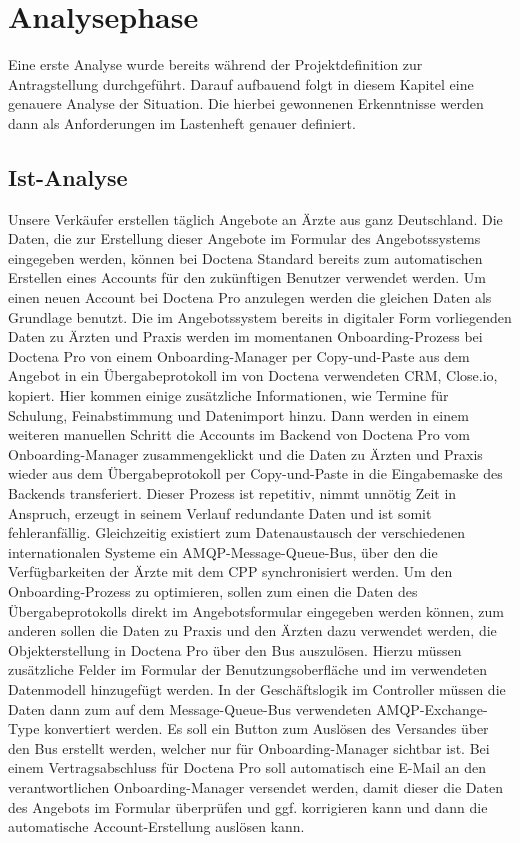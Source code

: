 \section{Analysephase} 
\label{sec:Analysephase}
Eine erste Analyse wurde bereits während der Projektdefinition zur Antragstellung durchgeführt. Darauf aufbauend folgt in diesem Kapitel eine genauere Analyse der Situation. Die hierbei gewonnenen Erkenntnisse werden dann als Anforderungen im Lastenheft genauer definiert.

\subsection{Ist-Analyse} 
\label{sec:IstAnalyse}
Unsere Verkäufer erstellen täglich Angebote an Ärzte aus ganz Deutschland. Die Daten, die zur Erstellung dieser Angebote im Formular des Angebotssystems eingegeben werden, können bei Doctena Standard bereits zum automatischen Erstellen eines Accounts für den zukünftigen Benutzer verwendet werden.
Um einen neuen Account bei Doctena Pro anzulegen werden die gleichen Daten als Grundlage benutzt. Die im Angebotssystem bereits in digitaler Form vorliegenden Daten zu Ärzten und Praxis werden im momentanen Onboarding-Prozess bei Doctena Pro von einem Onboarding-Manager per Copy-und-Paste aus dem Angebot in ein Übergabeprotokoll im von Doctena verwendeten \ac{CRM}, Close.io, kopiert. Hier kommen einige zusätzliche Informationen, wie Termine für Schulung, Feinabstimmung und Datenimport hinzu. Dann werden in einem weiteren manuellen Schritt die Accounts im Backend von Doctena Pro vom Onboarding-Manager zusammengeklickt und die Daten zu Ärzten und Praxis wieder aus dem Übergabeprotokoll per Copy-und-Paste in die Eingabemaske des Backends transferiert. Dieser Prozess ist repetitiv, nimmt unnötig Zeit in Anspruch, erzeugt in seinem Verlauf redundante Daten und ist somit fehleranfällig.
Gleichzeitig existiert zum Datenaustausch der verschiedenen internationalen Systeme ein \ac{AMQP}-Message-Queue-Bus, über den die Verfügbarkeiten der Ärzte mit dem \ac{CPP} synchronisiert werden.
Um den Onboarding-Prozess zu optimieren, sollen zum einen die Daten des Übergabeprotokolls direkt im Angebotsformular eingegeben werden können, zum anderen sollen die Daten zu Praxis und den Ärzten dazu verwendet werden, die Objekterstellung in Doctena Pro über den Bus auszulösen. Hierzu müssen zusätzliche Felder im Formular der Benutzungsoberfläche und im verwendeten Datenmodell hinzugefügt werden. In der Geschäftslogik im Controller müssen die Daten dann zum auf dem Message-Queue-Bus verwendeten \ac{AMQP}-Exchange-Type konvertiert werden. Es soll ein Button zum Auslösen des Versandes über den Bus erstellt werden, welcher nur für Onboarding-Manager sichtbar ist. Bei einem Vertragsabschluss für Doctena Pro soll automatisch eine E-Mail an den verantwortlichen Onboarding-Manager versendet werden, damit dieser die Daten des Angebots im Formular überprüfen und ggf. korrigieren kann und dann die automatische Account-Erstellung auslösen kann.

